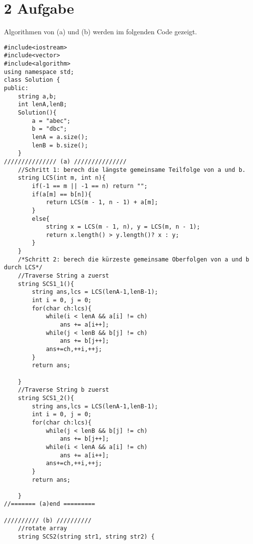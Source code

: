 \documentclass[fleqn]{article}
\begin{document}
\pagestyle{main}

\section{2 Aufgabe}

Algorithmen von (a) und (b) werden im folgenden Code gezeigt. 

\begin{lstlisting}
#include<iostream>
#include<vector>
#include<algorithm>
using namespace std;
class Solution {
public:
    string a,b;
    int lenA,lenB;
    Solution(){
        a = "abec";
        b = "dbc";
        lenA = a.size();
        lenB = b.size();
    }
/////////////// (a) ///////////////
    //Schritt 1: berech die längste gemeinsame Teilfolge von a und b.
    string LCS(int m, int n){ 
        if(-1 == m || -1 == n) return ""; 
        if(a[m] == b[n]){
            return LCS(m - 1, n - 1) + a[m];
        } 
        else{
            string x = LCS(m - 1, n), y = LCS(m, n - 1);
            return x.length() > y.length()? x : y; 
        } 
    }
    /*Schritt 2: berech die kürzeste gemeinsame Oberfolgen von a und b durch LCS*/ 
    //Traverse String a zuerst
    string SCS1_1(){
        string ans,lcs = LCS(lenA-1,lenB-1); 
        int i = 0, j = 0;
        for(char ch:lcs){
            while(i < lenA && a[i] != ch)
                ans += a[i++];
            while(j < lenB && b[j] != ch)
                ans += b[j++];
            ans+=ch,++i,++j;
        }
        return ans;

    }
    //Traverse String b zuerst
    string SCS1_2(){
        string ans,lcs = LCS(lenA-1,lenB-1); 
        int i = 0, j = 0;
        for(char ch:lcs){
            while(j < lenB && b[j] != ch)
                ans += b[j++];
            while(i < lenA && a[i] != ch)
                ans += a[i++];
            ans+=ch,++i,++j;
        }
        return ans;

    }
//======= (a)end =========

////////// (b) //////////
    //rotate array
    string SCS2(string str1, string str2) {
            

\end{lstlisting}
\end{document}
